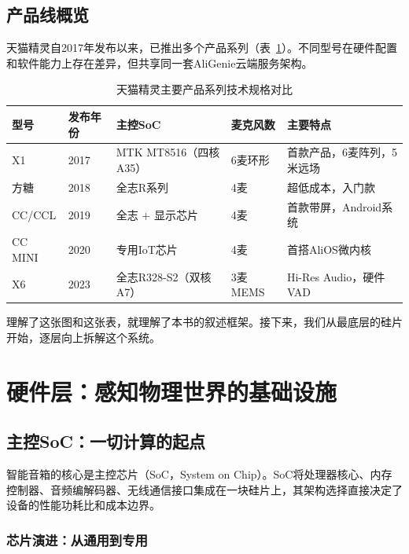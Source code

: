 \documentclass[12pt, a4paper, twoside, openright]{book}
\begin{document}
\section{产品线概览}

天猫精灵自2017年发布以来，已推出多个产品系列（表~\ref{tab:products}）。不同型号在硬件配置和软件能力上存在差异，但共享同一套AliGenie云端服务架构。

\begin{table}[H]
\centering
\caption{天猫精灵主要产品系列技术规格对比}
\label{tab:products}
\begin{tabularx}{\linewidth}{l l l l X}
\toprule
\textbf{型号} & \textbf{发布年份} & \textbf{主控SoC} & \textbf{麦克风数} & \textbf{主要特点} \\
\midrule
X1     & 2017 & MTK MT8516（四核A35） & 6麦环形 & 首款产品，6麦阵列，5米远场 \\
方糖   & 2018 & 全志R系列             & 4麦     & 超低成本，入门款 \\
CC/CCL & 2019 & 全志 + 显示芯片        & 4麦     & 首款带屏，Android系统 \\
CC MINI& 2020 & 专用IoT芯片            & 4麦     & 首搭AliOS微内核 \\
X6     & 2023 & 全志R328-S2（双核A7）  & 3麦MEMS & Hi-Res Audio，硬件VAD \\
\bottomrule
\end{tabularx}
\end{table}

理解了这张图和这张表，就理解了本书的叙述框架。接下来，我们从最底层的硅片开始，逐层向上拆解这个系统。

\chapter{硬件层：感知物理世界的基础设施}
\label{chap:hardware}

\section{主控SoC：一切计算的起点}

智能音箱的核心是主控芯片（SoC，System on Chip）。SoC将处理器核心、内存控制器、音频编解码器、无线通信接口集成在一块硅片上，其架构选择直接决定了设备的性能功耗比和成本边界。

\subsection{芯片演进：从通用到专用}
\end{document}
